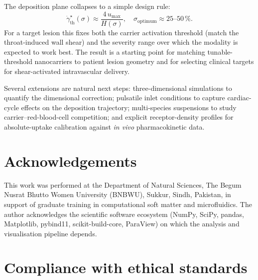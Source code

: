 \documentclass[11pt,a4paper]{article}
\begin{document}
The deposition plane collapses to a simple design rule:
\begin{equation}
\dot\gamma_{\text{th}}^{\star}(\sigma) \approx
   \frac{4\,u_{\max}}{H(\sigma)},
\quad
\sigma_{\text{optimum}} \approx 25\text{--}50\,\%.
\label{eq:design-rule-final}
\end{equation}
For a target lesion this fixes both the carrier activation
threshold (match the throat-induced wall shear) and the severity
range over which the modality is expected to work best. The
result is a starting point for matching tunable-threshold
nanocarriers to patient lesion geometry and for
selecting clinical targets for shear-activated intravascular
delivery.

Several extensions are natural next steps: three-dimensional
simulations to quantify the dimensional correction; pulsatile
inlet conditions to capture cardiac-cycle effects on the
deposition trajectory; multi-species suspensions to study
carrier--red-blood-cell competition; and explicit
receptor-density profiles for absolute-uptake calibration
against \emph{in vivo} pharmacokinetic data.

\section*{Acknowledgements}

This work was performed at the Department of Natural Sciences,
The Begum Nusrat Bhutto Women University (BNBWU), Sukkur, Sindh,
Pakistan, in support of graduate training in computational soft
matter and microfluidics. The author acknowledges the scientific
software ecosystem (NumPy, SciPy, pandas, Matplotlib, pybind11,
scikit-build-core, ParaView) on which the analysis and
visualisation pipeline depends.

\section*{Compliance with ethical standards}
\end{document}
